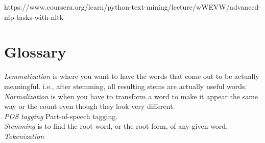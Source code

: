 \documentclass[11pt,a4paper]{article}
\begin{document}
https://www.coursera.org/learn/python-text-mining/lecture/wWEVW/advanced-nlp-tasks-with-nltk


\section*{Glossary}
{\it Lemmatization} is where you want to have the words that come out to be actually meaningful. i.e., after stemming, all resulting stems are actually useful words.\\

\noindent
{\it Normalization} is when you have to transform a word to make it appear
the same way or the count even though they look very different.\\

\noindent
{\it  POS tagging} Part-of-speech tagging. \\

\noindent
{\it Stemming} is to find the root word, or the root form, of any given word.\\

\noindent
{\it Tokenization} \\
\end{document}
